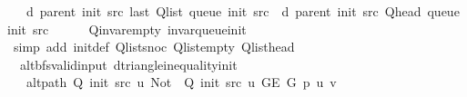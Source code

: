 \begin{isabellebody}
\ \ \ {\isachardoublequoteopen}d\ {\isacharparenleft}{\kern0pt}parent\ {\isacharparenleft}{\kern0pt}init\ src{\isacharparenright}{\kern0pt}{\isacharparenright}{\kern0pt}\ {\isacharparenleft}{\kern0pt}last\ {\isacharparenleft}{\kern0pt}Q{\isacharunderscore}{\kern0pt}list\ {\isacharparenleft}{\kern0pt}queue\ {\isacharparenleft}{\kern0pt}init\ src{\isacharparenright}{\kern0pt}{\isacharparenright}{\kern0pt}{\isacharparenright}{\kern0pt}{\isacharparenright}{\kern0pt}\ {\isasymle}\ d\ {\isacharparenleft}{\kern0pt}parent\ {\isacharparenleft}{\kern0pt}init\ src{\isacharparenright}{\kern0pt}{\isacharparenright}{\kern0pt}\ {\isacharparenleft}{\kern0pt}Q{\isacharunderscore}{\kern0pt}head\ {\isacharparenleft}{\kern0pt}queue\ {\isacharparenleft}{\kern0pt}init\ src{\isacharparenright}{\kern0pt}{\isacharparenright}{\kern0pt}{\isacharparenright}{\kern0pt}\ {\isacharplus}{\kern0pt}\ {}{\isachardoublequoteclose}%
\endisataginvisible
{\isafoldinvisible}%
%
\isadeliminvisible
\isanewline
%
\endisadeliminvisible
%
\isadelimproof
\ \ %
\endisadelimproof
%
\isatagproof
{}\isamarkupfalse%
\ Q{\isachardot}{\kern0pt}invar{\isacharunderscore}{\kern0pt}empty\ invar{\isacharunderscore}{\kern0pt}queue{\isacharunderscore}{\kern0pt}init\isanewline
\ \ \isamarkupfalse%
\ {\isacharparenleft}{\kern0pt}simp\ add{\isacharcolon}{\kern0pt}\ init{\isacharunderscore}{\kern0pt}def\ Q{\isachardot}{\kern0pt}list{\isacharunderscore}{\kern0pt}snoc\ Q{\isachardot}{\kern0pt}list{\isacharunderscore}{\kern0pt}empty\ Q{\isachardot}{\kern0pt}list{\isacharunderscore}{\kern0pt}head{\isacharparenright}{\kern0pt}%
\endisatagproof
{\isafoldproof}%
%
\isadelimproof
\isanewline
%
\endisadelimproof
%
\isadeliminvisible
\isanewline
%
\endisadeliminvisible
%
\isataginvisible
{}\isamarkupfalse%
\ {\isacharparenleft}{\kern0pt}\ alt{\isacharunderscore}{\kern0pt}bfs{\isacharunderscore}{\kern0pt}valid{\isacharunderscore}{\kern0pt}input{\isacharparenright}{\kern0pt}\ d{\isacharunderscore}{\kern0pt}triangle{\isacharunderscore}{\kern0pt}inequality{\isacharunderscore}{\kern0pt}init{\isacharcolon}{\kern0pt}\isanewline
\ \ \ {\isachardoublequoteopen}alt{\isacharunderscore}{\kern0pt}path\ {\isacharparenleft}{\kern0pt}Q\ {\isacharparenleft}{\kern0pt}init\ src{\isacharparenright}{\kern0pt}\ u{\isacharparenright}{\kern0pt}\ {\isacharparenleft}{\kern0pt}Not\ {\isasymcirc}\ Q\ {\isacharparenleft}{\kern0pt}init\ src{\isacharparenright}{\kern0pt}\ u{\isacharparenright}{\kern0pt}\ {\isacharparenleft}{\kern0pt}G{\isachardot}{\kern0pt}E\ G{\isacharparenright}{\kern0pt}\ p\ u\ v{\isachardoublequoteclose}\isanewline

\end{isabellebody}
